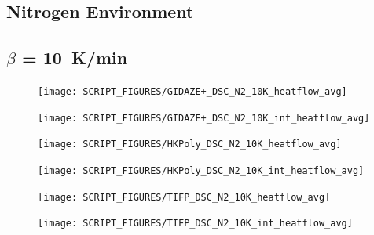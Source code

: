 \documentclass{book}
\begin{document}
\begin{landscape}
\section{Nitrogen Environment}
\label{DSC_N2}
\subsection{$\beta$ = 10~K/min}
\begin{minipage}{0.65\textwidth}
\begin{figure}[H]
{\texttt{[image: SCRIPT\_FIGURES/GIDAZE+\_DSC\_N2\_10K\_heatflow\_avg]}}\\
\end{figure}
\end{minipage}
\begin{minipage}{0.35\textwidth}
\begin{figure}[H]
{\texttt{[image: SCRIPT\_FIGURES/GIDAZE+\_DSC\_N2\_10K\_int\_heatflow\_avg]}}\\
\end{figure}
\end{minipage}


\begin{minipage}{0.65\textwidth}
\begin{figure}[H]
{\texttt{[image: SCRIPT\_FIGURES/HKPoly\_DSC\_N2\_10K\_heatflow\_avg]}}\\
\end{figure}
\end{minipage}
\begin{minipage}{0.35\textwidth}
\begin{figure}[H]
{\texttt{[image: SCRIPT\_FIGURES/HKPoly\_DSC\_N2\_10K\_int\_heatflow\_avg]}}\\
\end{figure}
\end{minipage}

\begin{minipage}{0.65\textwidth}
\begin{figure}[H]
{\texttt{[image: SCRIPT\_FIGURES/TIFP\_DSC\_N2\_10K\_heatflow\_avg]}}\\
\end{figure}
\end{minipage}
\begin{minipage}{0.35\textwidth}
\begin{figure}[H]
{\texttt{[image: SCRIPT\_FIGURES/TIFP\_DSC\_N2\_10K\_int\_heatflow\_avg]}}\\
\end{figure}
\end{minipage}
\vfill


\end{landscape}
\end{document}
